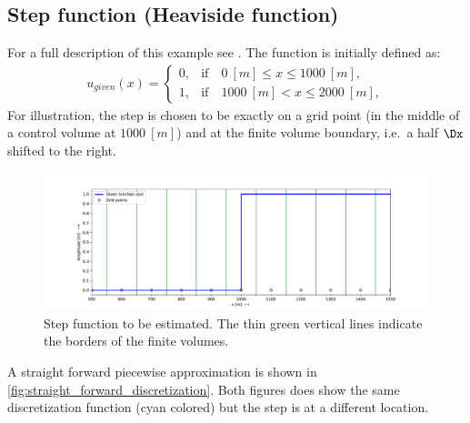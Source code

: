 \subsection{Step function (Heaviside function)}
For a full description of this example see \citet[eq.\ 5]{Borsboom2003}.
The function is initially defined as:
\begin{align}
    u_{given}(x) =
    \begin{cases}
        0, & \text{if} \quad 0\ [m] \leq x \leq 1000\ [m],
        \\
        1, & \text{if} \quad 1000\ [m] < x \leq 2000 \ [m],
    \end{cases}
\end{align}
For illustration, the step is chosen to be exactly on a grid point (in the middle of a control volume at $1000\ [m]$) and at the finite volume boundary, i.e.\ a half $\Dx$ shifted to the right.
\begin{figure}[H]
    \centering
    \includegraphics[width=1.0\textwidth]{figures/1d_step_function_dx100.pdf}
    \caption{Step function to be estimated. The thin green vertical lines indicate the  borders of the finite volumes.\label{fig:ex_step_function}}
\end{figure}
A straight forward piecewise approximation is shown in \autoref{fig:straight_forward_discretization}.
Both figures does show the same discretization function (cyan colored) but the step is at a different location.
%
